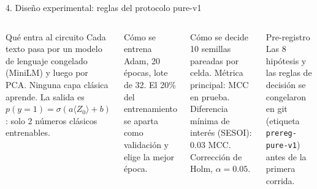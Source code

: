 \documentclass[aspectratio=169,10pt]{beamer}
\begin{document}
\begin{frame}{4. Diseño experimental: reglas del protocolo pure-v1}
\begin{columns}[T]
\begin{azulbox}{Qué entra al circuito}
Cada texto pasa por un modelo de lenguaje congelado (MiniLM) y luego por PCA. Ninguna capa clásica aprende. La salida es $p(y=1)=\sigma(a\langle Z_0\rangle+b)$: solo 2 números clásicos entrenables.
\end{azulbox}
\begin{azulbox}{Cómo se entrena}
Adam, 20 épocas, lote de 32. El 20\% del entrenamiento se aparta como validación y elige la mejor época.
\end{azulbox}
\begin{verdebox}{Cómo se decide}
10 semillas pareadas por celda. Métrica principal: MCC en prueba. Diferencia mínima de interés (SESOI): 0.03 MCC. Corrección de Holm, $\alpha=0.05$.
\end{verdebox}
\begin{ambarbox}{Pre-registro}
Las 8 hipótesis y las reglas de decisión se congelaron en git (etiqueta \texttt{prereg-pure-v1}) antes de la primera corrida.
\end{ambarbox}
\end{columns}
\end{frame}
\end{document}
